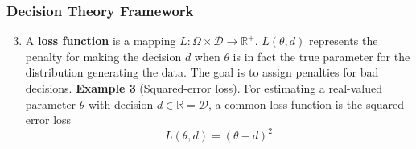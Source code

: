 \documentclass[10pt]{beamer}
\begin{document}
\begin{frame}
\frametitle{Decision Theory Framework}
\begin{enumerate}
\setcounter{enumi}{2}
\item{A \textbf{loss function} is a mapping $L: \Omega \times \mathcal{D} \rightarrow \mathbb{R}^{+}$. 
\newline
\newline 
$L(\theta, d)$ represents the penalty for making the decision $d$ when $\theta$ is in fact the true parameter for the distribution generating the data. 
\newline
\newline 
The goal is to assign penalties for bad decisions.
\newline
\newline 
\textbf{Example 3} (Squared-error loss). 
\newline
\newline 
For estimating a real-valued parameter $\theta$ with decision $d \in \mathbb{R} = \mathcal{D}$, a common loss function is the squared-error loss
$$ L(\theta, d) = (\theta - d)^2$$ 
}	
\end{enumerate}

	
\end{frame}



\begin{frame}
\end{frame}

\begin{frame}
\end{frame}

\begin{frame}
\end{frame}
\end{document}
